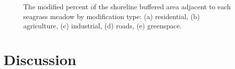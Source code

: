 \documentclass[12pt]{article}\usepackage[]{graphicx}\usepackage[]{color}
\begin{document}
\begin{figure}[H]

{\centering {} 

}

\caption{The modified percent of the shoreline buffered area adjacent to each seagrass meadow by modification type: (a) residential, (b) agriculture, (c) industrial, (d) roads, (e) greenspace.}\label{fig:percentmodpertype}
\end{figure}
\hypertarget{discussion}{%
\section{Discussion}\label{discussion}}
\end{document}
